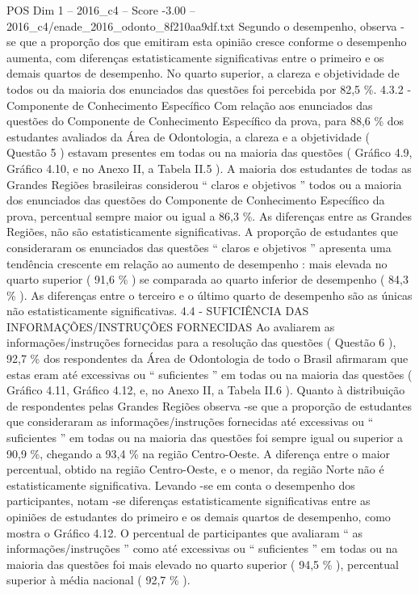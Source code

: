 \begin{textsample}{POS Dim 1 – 2016\_c4 – Score -3.00 – 2016\_c4/enade\_2016\_odonto\_8f210aa9df.txt}
Segundo o desempenho, observa -se que a proporção dos que emitiram esta opinião cresce conforme o desempenho aumenta, com diferenças estatisticamente significativas entre o primeiro e os demais quartos de desempenho.
No quarto superior, a clareza e objetividade de todos ou da maioria dos enunciados das questões foi percebida por 82,5 \%. 4.3.2 - Componente de Conhecimento Específico Com relação aos enunciados das questões do Componente de Conhecimento Específico da prova, para 88,6 \% dos estudantes avaliados da Área de Odontologia, a clareza e a objetividade ( Questão 5 ) estavam presentes em todas ou na maioria das questões ( Gráfico 4.9, Gráfico 4.10, e no Anexo II, a Tabela II.5 ).
A maioria dos estudantes de todas as Grandes Regiões brasileiras considerou “ claros e objetivos ” todos ou a maioria dos enunciados das questões do Componente de Conhecimento Específico da prova, percentual sempre maior ou igual a 86,3 \%.
As diferenças entre as Grandes Regiões, não são estatisticamente significativas.
A proporção de estudantes que consideraram os enunciados das questões “ claros e objetivos ” apresenta uma tendência crescente em relação ao aumento de desempenho : mais elevada no quarto superior ( 91,6 \% ) se comparada ao quarto inferior de desempenho ( 84,3 \% ).
As diferenças entre o terceiro e o último quarto de desempenho são as únicas não estatisticamente significativas. 4.4 - SUFICIÊNCIA DAS INFORMAÇÕES/INSTRUÇÕES FORNECIDAS Ao avaliarem as informações/instruções fornecidas para a resolução das questões ( Questão 6 ), 92,7 \% dos respondentes da Área de Odontologia de todo o Brasil afirmaram que estas eram até excessivas ou “ suficientes ” em todas ou na maioria das questões ( Gráfico 4.11, Gráfico 4.12, e, no Anexo II, a Tabela II.6 ).
Quanto à distribuição de respondentes pelas Grandes Regiões observa -se que a proporção de estudantes que consideraram as informações/instruções fornecidas até excessivas ou “ suficientes ” em todas ou na maioria das questões foi sempre igual ou superior a 90,9 \%, chegando a 93,4 \% na região Centro-Oeste.
A diferença entre o maior percentual, obtido na região Centro-Oeste, e o menor, da região Norte não é estatisticamente significativa.
Levando -se em conta o desempenho dos participantes, notam -se diferenças estatisticamente significativas entre as opiniões de estudantes do primeiro e os demais quartos de desempenho, como mostra o Gráfico 4.12.
O percentual de participantes que avaliaram “ as informações/instruções ” como até excessivas ou “ suficientes ” em todas ou na maioria das questões foi mais elevado no quarto superior ( 94,5 \% ), percentual superior à média nacional ( 92,7 \% ).

\end{textsample}
